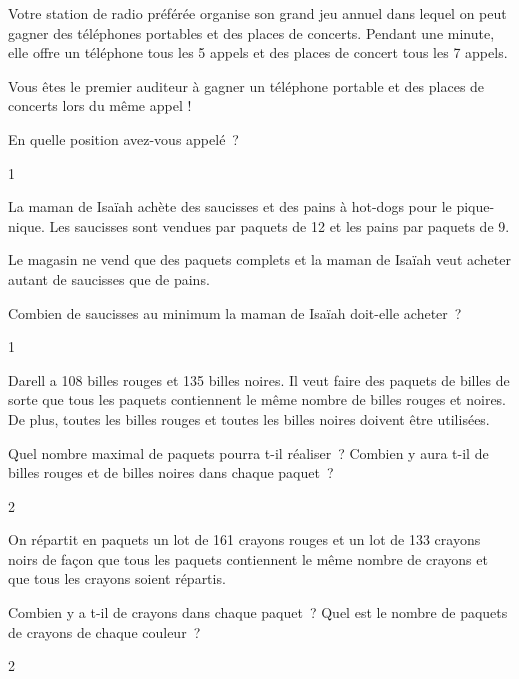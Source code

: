 \documentclass[a4paper,11pt]{report}
\begin{document}
\newpage

\begin{exo}{ %
    Votre station de radio préférée organise son grand jeu annuel dans lequel on peut gagner des téléphones portables et des places de concerts. Pendant une minute, elle offre un téléphone tous les 5 appels et des places de concert tous les 7 appels. 

    Vous êtes le premier auditeur à gagner un téléphone portable et des places de concerts lors du même appel ! 

    En quelle position avez-vous appelé~? 
}{1}\end{exo}








\begin{exo}{ %
    La maman de Isaïah achète des saucisses et des pains à hot-dogs pour le pique-nique. Les saucisses sont vendues par paquets de 12 et les pains par paquets de 9.

    Le magasin ne vend que des paquets complets et la maman de Isaïah veut acheter autant de saucisses que de pains.

    Combien de saucisses au minimum la maman de Isaïah doit-elle acheter~? 
}{1}\end{exo}




\begin{exo}{ %
    Darell a 108 billes rouges et 135 billes noires. Il veut faire des paquets de billes de sorte que tous les paquets contiennent le même nombre de billes rouges et noires.
    De plus, toutes les billes rouges et toutes les billes noires doivent être utilisées.
    \begin{tasks}[label-width = 1em ,item-indent = 2em ,before-skip = -0.4em, after-skip = -0.4em , label-offset=0.666em,after-item-skip = 0.3em]
        \task Quel nombre maximal de paquets pourra t-il réaliser~?
        \task Combien y aura t-il de billes rouges et de billes noires dans chaque paquet~?
    \end{tasks}
}{2}\end{exo}


\begin{exo}{ %
    On répartit en paquets un lot de 161 crayons rouges et un lot de 133 crayons noirs de façon que tous les paquets contiennent le même nombre de crayons et que tous les crayons soient répartis.
    \begin{tasks}[label-width = 1em ,item-indent = 2em ,before-skip = -0.4em, after-skip = -0.4em , label-offset=0.666em,after-item-skip = 0.3em]
        \task Combien y a t-il de crayons dans chaque paquet~?
        \task Quel est le nombre de paquets de crayons de chaque couleur~?
    \end{tasks}
}{2}\end{exo}
\end{document}
